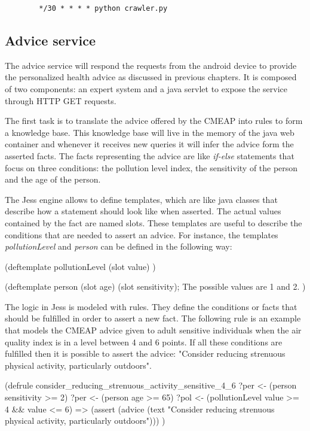 {\centering
\begin{BVerbatim}
        */30 * * * * python crawler.py
\end{BVerbatim}
\par
}

\subsection{Advice service}
The advice service will respond the requests from the android device to provide the personalized health advice as discussed in previous chapters. It is composed of two components: an expert system and a java servlet to expose the service through HTTP GET requests. 

The first task is to translate the advice offered by the CMEAP into rules to form a knowledge base. This knowledge base will live in the memory of the java web container and whenever it receives new queries it will infer the advice form the asserted facts. The facts representing the advice are like \textit{if-else} statements that focus on three conditions: the pollution level index, the sensitivity of the person and the age of the person. 

The Jess engine allows to define templates, which are like java classes that describe how a statement should look like when asserted. The actual values contained by the fact are named slots. These templates are useful to describe the conditions that are needed to assert an advice. For instance, the templates \textit{pollutionLevel} and \textit{person} can be defined in the following way: 

{\centering
\begin{spverbatim}
(deftemplate pollutionLevel
    (slot value)
)

(deftemplate person
    (slot age)
    (slot sensitivity); The possible values are 1 and 2.
)
\end{spverbatim}
\par
}

The logic in Jess is modeled with rules. They define the conditions or facts that should be fulfilled in order to assert a new fact. The following rule is an example that models the CMEAP advice given to adult sensitive individuals when the air quality index is in a level between 4 and 6 points. If all these conditions are fulfilled then it is possible to assert the advice: "Consider reducing strenuous physical activity, particularly outdoors". 

{\centering
\begin{spverbatim}
(defrule consider_reducing_strenuous_activity_sensitive_4_6
    ?per <- (person {sensitivity >= 2})
    ?per <- (person {age >= 65})
    ?pol <- (pollutionLevel {value >= 4 && value <= 6})
    =>
    (assert
        (advice (text "Consider reducing strenuous physical activity, particularly outdoors")))
)
\end{spverbatim}
\par
}

